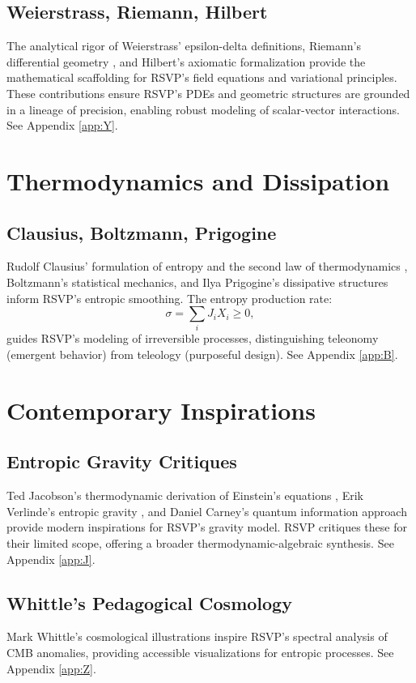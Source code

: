 \documentclass[12pt]{report}
\begin{document}
\section{Weierstrass, Riemann, Hilbert}
The analytical rigor of Weierstrass’ epsilon-delta definitions, Riemann’s differential geometry \citep{Riemann1854}, and Hilbert’s axiomatic formalization \citep{Hilbert1900} provide the mathematical scaffolding for RSVP’s field equations and variational principles. These contributions ensure RSVP’s PDEs and geometric structures are grounded in a lineage of precision, enabling robust modeling of scalar-vector interactions. See Appendix \ref{app:Y}.

\chapter{Thermodynamics and Dissipation}
\section{Clausius, Boltzmann, Prigogine}
Rudolf Clausius’ formulation of entropy and the second law of thermodynamics \citep{Clausius1865}, Boltzmann’s statistical mechanics, and Ilya Prigogine’s dissipative structures \citep{Prigogine1977} inform RSVP’s entropic smoothing. The entropy production rate:
\begin{equation}
\sigma = \sum_i J_i X_i \geq 0, \label{eq:entropy}
\end{equation}
guides RSVP’s modeling of irreversible processes, distinguishing teleonomy (emergent behavior) from teleology (purposeful design). See Appendix \ref{app:B}.

\chapter{Contemporary Inspirations}
\section{Entropic Gravity Critiques}
Ted Jacobson’s thermodynamic derivation of Einstein’s equations \citep{Jacobson1995}, Erik Verlinde’s entropic gravity \citep{Verlinde2011}, and Daniel Carney’s quantum information approach \citep{Carney2019} provide modern inspirations for RSVP’s gravity model. RSVP critiques these for their limited scope, offering a broader thermodynamic-algebraic synthesis. See Appendix \ref{app:J}.
\section{Whittle’s Pedagogical Cosmology}
Mark Whittle’s cosmological illustrations \citep{Whittle2008} inspire RSVP’s spectral analysis of CMB anomalies, providing accessible visualizations for entropic processes. See Appendix \ref{app:Z}.
\end{document}
